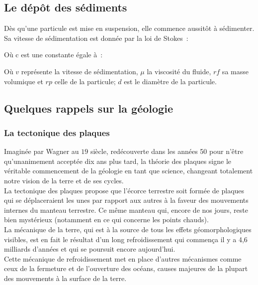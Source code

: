 \documentclass[a4paper,11pt]{article}
\begin{document}
\subsection{Le dépôt des sédiments}

Dès qu'une particule est mise en suspension, elle commence aussitôt à sédimenter. Sa vitesse de sédimentation est donnée par la loi de Stokes~:
\begin{center}
\end{center}
Où c est une constante égale à~:
\begin{center}
\end{center}

Où $v$ représente la vitesse de sédimentation, $\mu$ la viscosité du fluide, $rf$ sa masse volumique et $rp$ celle de la particule; $d$ est le diamètre de la particule.

\subsection{Quelques rappels sur la géologie}

\subsubsection{La tectonique des plaques}

Imaginée par Wagner au $19$ siècle, redécouverte dans les années 50 pour n'être qu'unanimement acceptée dix ans plus tard, la théorie des plaques signe le véritable commencement de la géologie en tant que science, changeant totalement notre vision de la terre et de ses cycles. \\
La tectonique des plaques propose que l'écorce terrestre soit formée de plaques qui se déplaceraient les unes par rapport aux autres à la faveur des mouvements internes du manteau terrestre. Ce même manteau qui, encore de nos jours, reste bien mystérieux (notamment en ce qui concerne les points chauds). \\
La mécanique de la terre, qui est à la source de tous les effets géomorphologiques visibles, est en fait le résultat d'un long refroidissement qui commença il y a 4,6 milliards d'années et qui se poursuit encore aujourd'hui.\\
Cette mécanique de refroidissement met en place d'autres mécanismes comme ceux de la fermeture et de l'ouverture des océans, causes majeures de la plupart des mouvements à la surface de la terre.
\end{document}

